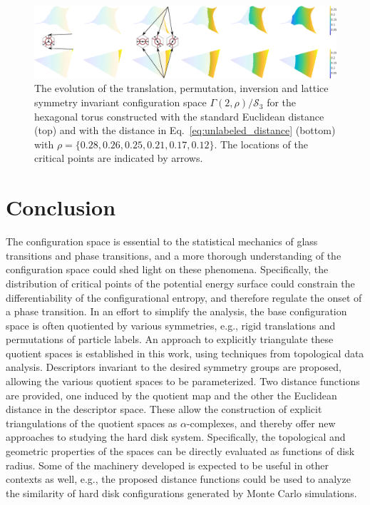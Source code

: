 \documentclass[default,iicol]{sn-jnl}%
\theoremstyle{thmstyleone}%
\theoremstyle{thmstyletwo}%
\theoremstyle{thmstylethree}%
\begin{document}
\begin{figure}
	\centering
	\includegraphics[width=1.0\textwidth]{figure13.eps}
	\caption{The evolution of the translation, permutation, inversion and lattice symmetry invariant configuration space $\Gamma(2, \rho) / \mathcal{S}_3$ for the hexagonal torus constructed with the standard Euclidean distance (top) and with the distance in Eq.\ \ref{eq:unlabeled_distance} (bottom) with $\rho=\{0.28, 0.26, 0.25, 0.21, 0.17, 0.12\}$. The locations of the critical points are indicated by arrows.}
	\label{fig:figure13}
\end{figure}	

\section{Conclusion}
\label{sec:conclusion}	

The configuration space is essential to the statistical mechanics of glass transitions and phase transitions, and a more thorough understanding of the configuration space could shed light on these phenomena. Specifically, the distribution of critical points of the potential energy surface could constrain the differentiability of the configurational entropy, and therefore regulate the onset of a phase transition. In an effort to simplify the analysis, the base configuration space is often quotiented by various symmetries, e.g., rigid translations and permutations of particle labels. An approach to explicitly triangulate these quotient spaces is established in this work, using techniques from topological data analysis. Descriptors invariant to the desired symmetry groups are proposed, allowing the various quotient spaces to be parameterized. Two distance functions are provided, one induced by the quotient map and the other the Euclidean distance in the descriptor space. These allow the construction of explicit triangulations of the quotient spaces as $\alpha$-complexes, and thereby offer new approaches to studying the hard disk system. Specifically, the topological and geometric properties of the spaces can be directly evaluated as functions of disk radius. Some of the machinery developed is expected to be useful in other contexts as well, e.g., the proposed distance functions could be used to analyze the similarity of hard disk configurations generated by Monte Carlo simulations.
\end{document}
